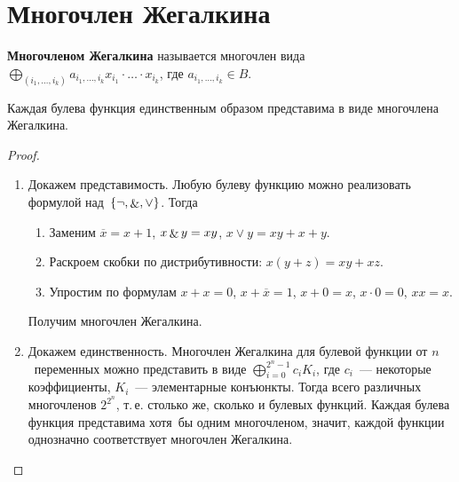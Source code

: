\section{Многочлен Жегалкина}
 \textbf{Многочленом Жегалкина} называется многочлен вида
$\bigoplus_{(i_1, \ldots, i_k)} a_{i_1, \ldots, i_k} x_{i_1} \cdot \ldots \cdot x_{i_k}$, где $a_{i_1, \ldots, i_k} \in B$.

\begin{theorem}[Жегалкина]
Каждая булева функция единственным образом представима в виде многочлена Жегалкина.
\end{theorem}
\begin{proof}
\begin{enumerate}
	\item Докажем представимость.
	Любую булеву функцию можно реализовать формулой над~$\{ \neg, \mathop{\&}, \lor \}$.
	Тогда
	\begin{enumerate}
		\item Заменим $\overline x = x + 1$, $x \mathop{\&} y = xy$, $x \lor y = xy + x + y$.
		\item Раскроем скобки по дистрибутивности: $x(y + z) = xy + xz$.
		\item Упростим по формулам $x + x = 0$, $x + \overline x = 1$, $x + 0 = x$, $x \cdot 0 = 0$, $xx = x$.
	\end{enumerate}
	
	Получим многочлен Жегалкина.
	
	\item Докажем единственность.
	Многочлен Жегалкина для булевой функции от $n$~переменных можно представить в виде $\displaystyle \bigoplus_{i=0}^{2^n-1} c_i K_i$, где $c_i$~--- некоторые коэффициенты, $K_i$~--- элементарные конъюнкты.
	Тогда всего различных многочленов $2^{2^n}$, т.\,е. столько же, сколько и булевых функций.
	Каждая булева функция представима хотя~бы одним многочленом, значит, каждой функции однозначно соответствует многочлен Жегалкина.
\end{enumerate}
\end{proof}

